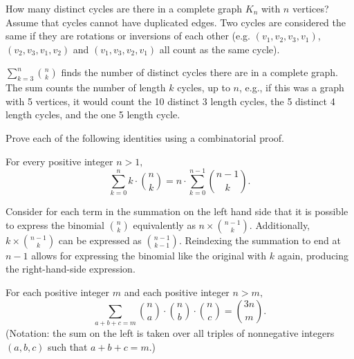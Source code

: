 \documentclass[11pt]{article}
\begin{document}
\begin{Parts}
    \Part How many distinct cycles are there in a complete graph $K_n$ with $n$
     vertices? Assume that cycles cannot have duplicated edges. Two cycles are
     considered the same if they are rotations or inversions of each other (e.g.
     $(v_1,v_2,v_3,v_1)$, $(v_2,v_3,v_1,v_2)$ and $(v_1,v_3,v_2,v_1)$ all count as
     the same cycle).

    \begin{solution}
        $\sum_{k=3}^{n} \binom{n}{k}$ finds the number of distinct cycles there 
        are in a complete graph. The sum counts the number of length $k$ cycles, 
        up to $n$, e.g., if this was a graph with 5 vertices, it would count the 10
        distinct 3 length cycles, the 5 distinct 4 length cycles, and the one 5 length
        cycle. 
    \end{solution}
     


\end{Parts}

Prove each of the following identities using a combinatorial proof.

\begin{Parts}

\Part For every positive integer $n>1,$ 
\[\sum_{k=0}^n k \cdot \binom{n}{k} = n\cdot \sum_{k=0}^{n - 1}\binom{n - 1}{k}.\]

\begin{solution}
    Consider for each term in the summation on the left hand side that it is
    possible to express the binomial $\binom{n}{k}$ equivalently as $n\times 
    \binom{n-1}{k}$. Additionally, $k \times \binom{n-1}{k}$ can be expressed
    as $\binom{n-1}{k-1}$. Reindexing the summation to end at $n-1$ allows for
    expressing the binomial like the original with $k$ again, producing the 
    right-hand-side expression. 
\end{solution}

\Part For each positive integer $m$ and each positive integer $n > m,$
\[\sum_{a + b + c = m} \binom{n}{a}\cdot\binom{n}{b}\cdot\binom{n}{c} = \binom{3n}{m}.\]
(Notation: the sum on the left is taken over all triples of nonnegative integers $(a,b,c)$ such that $a + b + c = m.$)

\end{Parts}

\end{document}
